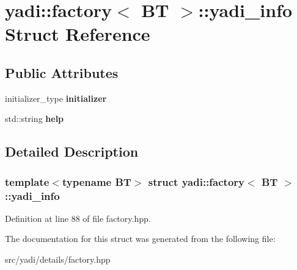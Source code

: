 \hypertarget{structyadi_1_1factory_1_1yadi__info}{}\section{yadi\+:\+:factory$<$ BT $>$\+:\+:yadi\+\_\+info Struct Reference}
\label{structyadi_1_1factory_1_1yadi__info}
\subsection*{Public Attributes}
\begin{DoxyCompactItemize}
\item 
\mbox{\label{structyadi_1_1factory_1_1yadi__info_a63c0e3eb9fd1e8051f5aacee3439c313}} 
initializer\+\_\+type {\bfseries initializer}
\item 
\mbox{\label{structyadi_1_1factory_1_1yadi__info_a5b9a7705a796247d0049755236516015}} 
std\+::string {\bfseries help}
\end{DoxyCompactItemize}


\subsection{Detailed Description}
\subsubsection*{template$<$typename BT$>$\newline
struct yadi\+::factory$<$ B\+T $>$\+::yadi\+\_\+info}



Definition at line 88 of file factory.\+hpp.



The documentation for this struct was generated from the following file\+:\begin{DoxyCompactItemize}
\item 
src/yadi/details/factory.\+hpp\end{DoxyCompactItemize}
